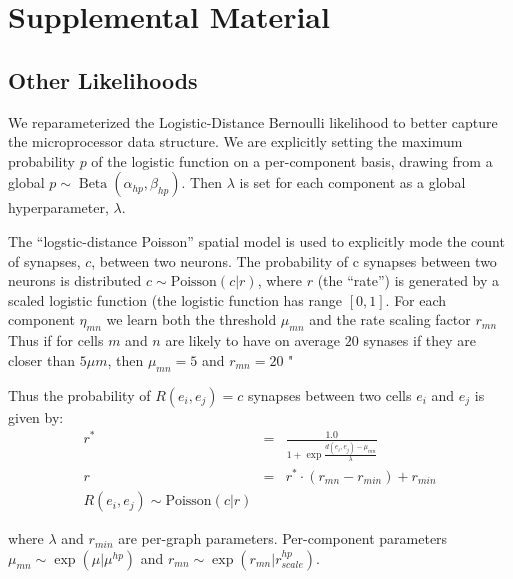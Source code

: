 \documentclass{nature}
\begin{document}
\newpage
\section{Supplemental Material}

\subsection{Other Likelihoods}
\label{supp:otherlikelihoods}

We reparameterized the Logistic-Distance Bernoulli likelihood to
better capture the microprocessor data structure. We are explicitly
setting the maximum probability $p$ of the logistic function on a
per-component basis, drawing from a global $p \sim \operatorname{Beta}(\alpha_{hp},
\beta_{hp})$. Then $\lambda$ is set for each component as a global
hyperparameter, $\lambda$.

The ``logstic-distance Poisson'' spatial model is used to explicitly mode the count of synapses, $c$, between two neurons. The probability of c synapses between two neurons is distributed $c \sim \textrm{Poisson}(c | r)$, where $r$ (the ``rate'') is generated by a scaled logistic function (the logistic function has range $[0, 1]$. For each component $\eta_{mn}$ we learn both the threshold $\mu_{mn}$ and the rate scaling factor $r_{mn}$ Thus if for cells $m$ and $n$ are likely to have on average $20$ synases if they are closer than $5 \mu m$, then $\mu_{mn} = 5$ and $r_{mn} = 20$  " 

Thus the probability of $R(e_i, e_j) = c$ synapses between two cells $e_i$ and $e_j$ is given by:
\begin{eqnarray}
r^* &=& \frac{1.0}{1 + \exp \frac{d(e_i, e_j) - \mu_{mn}}{\lambda}}\\
r & = & r^* \cdot (r_{mn} - r_{min}) + r_{min} \\
R(e_i, e_j) \sim \textrm{Poisson}(c | r)
\end{eqnarray}

where $\lambda$ and $r_{min}$ are per-graph parameters. Per-component parameters $\mu_{mn} \sim \exp(\mu | \mu^{hp})$ and $r_{mn} \sim \exp(r_{mn} | r_{scale}^{hp})$. 
\end{document}
